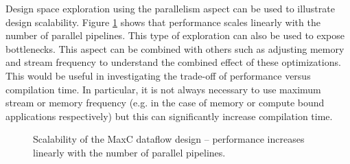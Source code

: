 Design space exploration using the parallelism aspect can be used to
illustrate design scalability. Figure \ref{fig:scalability} shows that
performance scales linearly with the number of parallel
pipelines. This type of exploration can also be used to expose
bottlenecks. This aspect can be combined with others such as adjusting
memory and stream frequency to understand the combined effect of these
optimizations. This would be useful in investigating the trade-off of
performance versus compilation time. In particular, it is not always
necessary to use maximum stream or memory frequency (e.g. in the case
of memory or compute bound applications respectively) but this can
significantly increase compilation time.

\begin{figure}[!h]
  \centering
  \caption{Scalability of the MaxC dataflow design -- performance
    increases linearly with the number of parallel pipelines.}
  \label{fig:scalability}
\end{figure}


